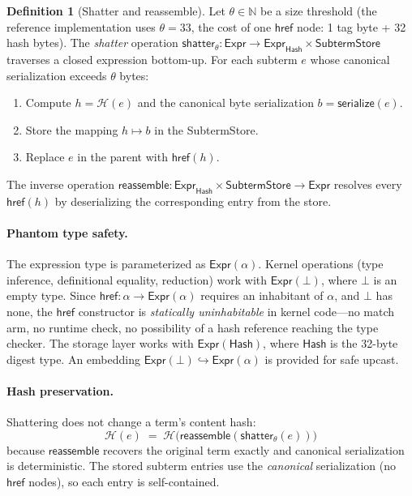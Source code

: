 \documentclass[11pt]{article}
\theoremstyle{definition}
\newtheorem{definition}{Definition}[section]
\theoremstyle{plain}
\theoremstyle{remark}
\newcommand{\hash}{\mathcal{H}}
\newcommand{\hrefE}{\textsf{href}}
\begin{document}
\begin{definition}[Shatter and reassemble]
\label{def:shatter}
Let $\theta \in \mathbb{N}$ be a size threshold (the reference implementation uses $\theta = 33$,
the cost of one $\hrefE$ node: 1 tag byte + 32 hash bytes).
The \emph{shatter} operation $\textsf{shatter}_\theta : \textsf{Expr} \to \textsf{Expr}_{\textsf{Hash}} \times \textsf{SubtermStore}$
traverses a closed expression bottom-up.
For each subterm $e$ whose canonical serialization exceeds $\theta$ bytes:
\begin{enumerate}[nosep]
  \item Compute $h = \hash(e)$ and the canonical byte serialization $b = \textsf{serialize}(e)$.
  \item Store the mapping $h \mapsto b$ in the \textsf{SubtermStore}.
  \item Replace $e$ in the parent with $\hrefE(h)$.
\end{enumerate}
The inverse operation $\textsf{reassemble} : \textsf{Expr}_{\textsf{Hash}} \times \textsf{SubtermStore} \to \textsf{Expr}$
resolves every $\hrefE(h)$ by deserializing the corresponding entry from the store.
\end{definition}

\paragraph{Phantom type safety.}
The expression type is parameterized as $\textsf{Expr}(\alpha)$.
Kernel operations (type inference, definitional equality, reduction) work with
$\textsf{Expr}(\bot)$, where $\bot$ is an empty type.
Since $\hrefE : \alpha \to \textsf{Expr}(\alpha)$ requires an inhabitant of $\alpha$,
and $\bot$ has none, the $\hrefE$ constructor is \emph{statically uninhabitable}
in kernel code---no match arm, no runtime check, no possibility of a hash reference
reaching the type checker.
The storage layer works with $\textsf{Expr}(\textsf{Hash})$, where $\textsf{Hash}$
is the 32-byte digest type.
An embedding $\textsf{Expr}(\bot) \hookrightarrow \textsf{Expr}(\alpha)$ is provided
for safe upcast.

\paragraph{Hash preservation.}
Shattering does not change a term's content hash:
\[\hash(e) \;=\; \hash\bigl(\textsf{reassemble}(\textsf{shatter}_\theta(e))\bigr)\]
because $\textsf{reassemble}$ recovers the original term exactly
and canonical serialization is deterministic.
The stored subterm entries use the \emph{canonical} serialization (no $\hrefE$ nodes),
so each entry is self-contained.
\end{document}
